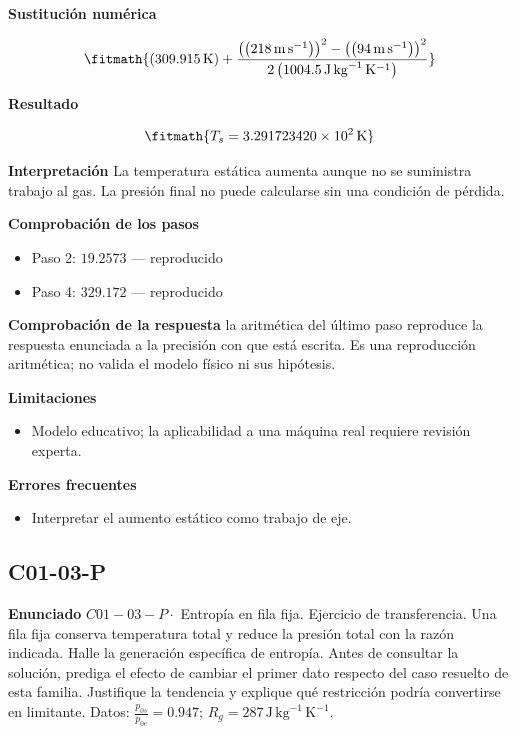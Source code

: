 \documentclass[10pt,openany]{book}
\begin{document}


\noindent\textbf{Sustitución numérica}

\[
\fitmath{\left(309.915\,\mathrm{K}\right) + \frac{\left(\left(218\,\mathrm{m}\,\mathrm{s}^{-1}\right)\right)^{2} - \left(\left(94\,\mathrm{m}\,\mathrm{s}^{-1}\right)\right)^{2}}{2 \left(1004.5\,\mathrm{J}\,\mathrm{kg}^{-1}\,\mathrm{K}^{-1}\right)}}
\]

\noindent\textbf{Resultado}

\[
\fitmath{T_s=3.291723420\times10^{2}\,\mathrm{K}}
\]

\noindent\textbf{Interpretación}
La temperatura estática aumenta aunque no se suministra trabajo al gas. La presión final no puede calcularse sin una condición de pérdida.

\noindent\textbf{Comprobación de los pasos}
\begin{itemize}
\item Paso 2: $19.2573$ — reproducido
\item Paso 4: $329.172$ — reproducido
\end{itemize}

\noindent\textbf{Comprobación de la respuesta} la aritmética del último paso reproduce la respuesta enunciada a la precisión con que está escrita. Es una reproducción aritmética; no valida el modelo físico ni sus hipótesis.

\noindent\textbf{Limitaciones}
\begin{itemize}
\item Modelo educativo; la aplicabilidad a una máquina real requiere revisión experta.
\end{itemize}

\noindent\textbf{Errores frecuentes}
\begin{itemize}
\item Interpretar el aumento estático como trabajo de eje.
\end{itemize}
\subsection*{C01-03-P}

\noindent\textbf{Enunciado}
\(C01-03-P \cdot\) Entropía en fila fija. Ejercicio de transferencia. Una fila fija conserva temperatura total y reduce la presión total con la razón indicada. Halle la generación específica de entropía. Antes de consultar la solución, prediga el efecto de cambiar el primer dato respecto del caso resuelto de esta familia. Justifique la tendencia y explique qué restricción podría convertirse en limitante. Datos: \(\frac{p_{0s}}{p_{0e}}=0.947\); \(R_g=287\, \mathrm{J}\,\mathrm{kg}^{-1}\,\mathrm{K}^{-1}\).
\end{document}
